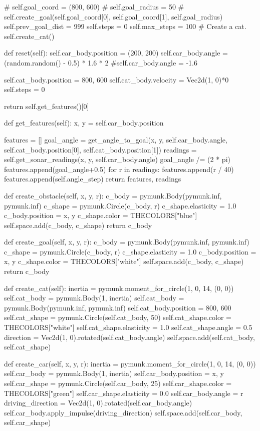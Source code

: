\begin{python}
# self.goal_coord = (800, 600)
# self.goal_radius = 50
# self.create_goal(self.goal_coord[0], self.goal_coord[1], self.goal_radius)
self.prev_goal_dist = 999
self.steps = 0
self.max_steps = 100
# Create a cat.
self.create_cat()

def reset(self):
self.car_body.position = (200, 200)
self.car_body.angle = (random.random() - 0.5) * 1.6 * 2
#self.car_body.angle = -1.6

self.cat_body.position = 800, 600
self.cat_body.velocity = Vec2d(1, 0)*0
self.steps = 0


return self.get_features()[0]

def get_features(self):
x, y = self.car_body.position

features = []
goal_angle = get_angle_to_goal(x, y, self.car_body.angle, self.cat_body.position[0], self.cat_body.position[1])
readings = self.get_sonar_readings(x, y, self.car_body.angle)
goal_angle /= (2 * pi)
features.append(goal_angle+0.5)
for r in readings:
features.append(r / 40)
features.append(self.angle_step)
return features, readings

def create_obstacle(self, x, y, r):
c_body = pymunk.Body(pymunk.inf, pymunk.inf)
c_shape = pymunk.Circle(c_body, r)
c_shape.elasticity = 1.0
c_body.position = x, y
c_shape.color = THECOLORS["blue"]
self.space.add(c_body, c_shape)
return c_body

def create_goal(self, x, y, r):
c_body = pymunk.Body(pymunk.inf, pymunk.inf)
c_shape = pymunk.Circle(c_body, r)
c_shape.elasticity = 1.0
c_body.position = x, y
c_shape.color = THECOLORS["white"]
self.space.add(c_body, c_shape)
return c_body

def create_cat(self):
inertia = pymunk.moment_for_circle(1, 0, 14, (0, 0))
self.cat_body = pymunk.Body(1, inertia)
self.cat_body = pymunk.Body(pymunk.inf, pymunk.inf)
self.cat_body.position = 800, 600
self.cat_shape = pymunk.Circle(self.cat_body, 50)
self.cat_shape.color = THECOLORS["white"]
self.cat_shape.elasticity = 1.0
self.cat_shape.angle = 0.5
direction = Vec2d(1, 0).rotated(self.cat_body.angle)
self.space.add(self.cat_body, self.cat_shape)

def create_car(self, x, y, r):
inertia = pymunk.moment_for_circle(1, 0, 14, (0, 0))
self.car_body = pymunk.Body(1, inertia)
self.car_body.position = x, y
self.car_shape = pymunk.Circle(self.car_body, 25)
self.car_shape.color = THECOLORS["green"]
self.car_shape.elasticity = 0.0
self.car_body.angle = r
driving_direction = Vec2d(1, 0).rotated(self.car_body.angle)
self.car_body.apply_impulse(driving_direction)
self.space.add(self.car_body, self.car_shape)


\end{python}
